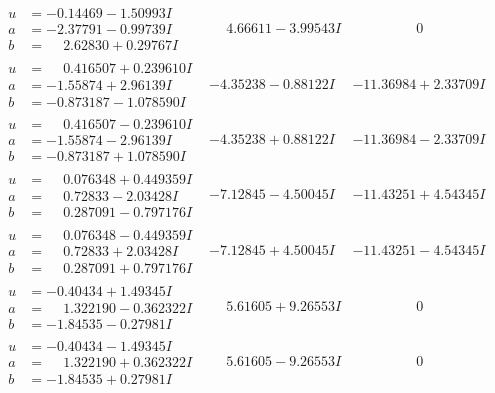\documentclass[1p]{elsarticle_modified}
\theoremstyle{definition}
\begin{document}
$$\begin{array}{c|c|c}
\begin{aligned}
u &= -0.14469 - 1.50993 I \\
a &= -2.37791 - 0.99739 I \\
b &= \phantom{-}2.62830 + 0.29767 I\end{aligned}
 & \phantom{-}4.66611 - 3.99543 I & \phantom{-0.000000 } 0 \\ \hline\begin{aligned}
u &= \phantom{-}0.416507 + 0.239610 I \\
a &= -1.55874 + 2.96139 I \\
b &= -0.873187 - 1.078590 I\end{aligned}
 & -4.35238 - 0.88122 I & -11.36984 + 2.33709 I \\ \hline\begin{aligned}
u &= \phantom{-}0.416507 - 0.239610 I \\
a &= -1.55874 - 2.96139 I \\
b &= -0.873187 + 1.078590 I\end{aligned}
 & -4.35238 + 0.88122 I & -11.36984 - 2.33709 I \\ \hline\begin{aligned}
u &= \phantom{-}0.076348 + 0.449359 I \\
a &= \phantom{-}0.72833 - 2.03428 I \\
b &= \phantom{-}0.287091 - 0.797176 I\end{aligned}
 & -7.12845 - 4.50045 I & -11.43251 + 4.54345 I \\ \hline\begin{aligned}
u &= \phantom{-}0.076348 - 0.449359 I \\
a &= \phantom{-}0.72833 + 2.03428 I \\
b &= \phantom{-}0.287091 + 0.797176 I\end{aligned}
 & -7.12845 + 4.50045 I & -11.43251 - 4.54345 I \\ \hline\begin{aligned}
u &= -0.40434 + 1.49345 I \\
a &= \phantom{-}1.322190 - 0.362322 I \\
b &= -1.84535 - 0.27981 I\end{aligned}
 & \phantom{-}5.61605 + 9.26553 I & \phantom{-0.000000 } 0 \\ \hline\begin{aligned}
u &= -0.40434 - 1.49345 I \\
a &= \phantom{-}1.322190 + 0.362322 I \\
b &= -1.84535 + 0.27981 I\end{aligned}
 & \phantom{-}5.61605 - 9.26553 I & \phantom{-0.000000 } 0 \\ \hline\begin{aligned}

\end{aligned}
\end{array}$$
\end{document}
